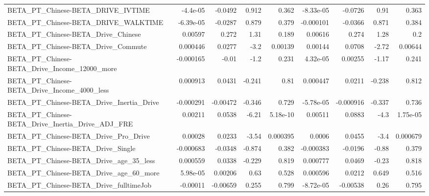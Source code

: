 \begin{tabular}{lrrrrrrrr}
BETA\_PT\_Chinese-BETA\_DRIVE\_IVTIME                  &    -4.4e-05 &      -0.0492 &    0.912 &    0.362 &  -8.33e-05 &     -0.0726 &         0.91 &         0.363 \\
BETA\_PT\_Chinese-BETA\_DRIVE\_WALKTIME                &   -6.39e-05 &      -0.0287 &    0.879 &    0.379 &  -0.000101 &     -0.0366 &        0.871 &         0.384 \\
BETA\_PT\_Chinese-BETA\_Drive\_Chinese                 &     0.00597 &        0.272 &     1.31 &    0.189 &    0.00616 &       0.274 &         1.28 &           0.2 \\
BETA\_PT\_Chinese-BETA\_Drive\_Commute                 &    0.000446 &       0.0277 &     -3.2 &  0.00139 &    0.00144 &      0.0708 &        -2.72 &       0.00644 \\
BETA\_PT\_Chinese-BETA\_Drive\_Income\_12000\_more       &   -0.000165 &        -0.01 &     -1.2 &    0.231 &   4.32e-05 &     0.00255 &        -1.17 &         0.241 \\
BETA\_PT\_Chinese-BETA\_Drive\_Income\_4000\_less        &    0.000913 &       0.0431 &   -0.241 &     0.81 &   0.000447 &      0.0211 &       -0.238 &         0.812 \\
BETA\_PT\_Chinese-BETA\_Drive\_Inertia\_Drive           &   -0.000291 &     -0.00472 &   -0.346 &    0.729 &  -5.78e-05 &   -0.000916 &       -0.337 &         0.736 \\
BETA\_PT\_Chinese-BETA\_Drive\_Inertia\_Drive\_ADJ\_FRE   &     0.00211 &       0.0538 &    -6.21 & 5.18e-10 &    0.00511 &      0.0883 &         -4.3 &      1.75e-05 \\
BETA\_PT\_Chinese-BETA\_Drive\_Pro\_Drive               &     0.00028 &       0.0233 &    -3.54 & 0.000395 &     0.0006 &      0.0455 &         -3.4 &      0.000679 \\
BETA\_PT\_Chinese-BETA\_Drive\_Single                  &   -0.000683 &      -0.0348 &   -0.874 &    0.382 &  -0.000383 &     -0.0196 &        -0.88 &         0.379 \\
BETA\_PT\_Chinese-BETA\_Drive\_age\_35\_less             &    0.000559 &       0.0338 &   -0.229 &    0.819 &   0.000777 &      0.0469 &        -0.23 &         0.818 \\
BETA\_PT\_Chinese-BETA\_Drive\_age\_60\_more             &    5.98e-05 &      0.00206 &     0.63 &    0.528 &   0.000596 &      0.0212 &        0.649 &         0.516 \\
BETA\_PT\_Chinese-BETA\_Drive\_fulltimeJob             &    -0.00011 &     -0.00659 &    0.255 &    0.799 &  -8.72e-05 &    -0.00538 &         0.26 &         0.795 \\

\end{tabular}
